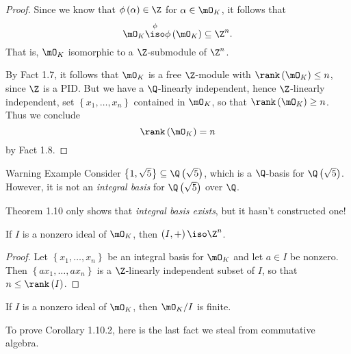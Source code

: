 \documentclass[pmath441]{subfiles}
\begin{document}
\begin{proof}
        Since we know that $\phi\left( \alpha \right)\in\Z$ for $\alpha\in\mO_K$, it follows that
        \begin{equation*}
            \mO_K \overset{\phi}{\iso} \phi\left( \mO_K \right)\subseteq\Z^n.
        \end{equation*}
        That is, $\mO_K$ isomorphic to a $\Z$-submodule of $\Z^n$.

        By Fact 1.7, it follows that $\mO_K$ is a free $\Z$-module with $\rank\left( \mO_K \right) \leq n$, since $\Z$ is a PID. But we have a $\Q$-linearly independent, hence $\Z$-linearly independent, set $\left\lbrace x_1,\ldots,x_n \right\rbrace$ contained in $\mO_K$, so that $\rank\left( \mO_K \right)\geq n$. Thus we conclude
        \begin{equation*}
            \rank\left( \mO_K \right) = n
        \end{equation*}
        by Fact 1.8.
    \end{proof}

    \begin{example}{Warning Example}
        Consider $\left\lbrace 1,\sqrt{5} \right\rbrace\subseteq\Q\left( \sqrt{5} \right)$, which is a $\Q$-basis for $\Q\left( \sqrt{5} \right)$. However, it is not an \textit{integral basis} for $\Q\left( \sqrt{5} \right)$ over $\Q$.

        Theorem 1.10 only shows that \textit{integral basis exists}, but it hasn't constructed one!
    \end{example}

    \rruleline

    \begin{cor}{}
        If $I$ is a nonzero ideal of $\mO_K$, then $\left( I,+ \right)\iso\Z^n$.
    \end{cor}	

    \begin{proof}
        Let $\left\lbrace x_1,\ldots,x_n \right\rbrace$ be an integral basis for $\mO_K$ and let $a\in I$ be nonzero. Then $\left\lbrace ax_1,\ldots,ax_n \right\rbrace$ is a $\Z$-linearly independent subset of $I$, so that $n\leq\rank\left( I \right)$.
    \end{proof}

    \begin{cor}{}
        If $I$ is a nonzero ideal of $\mO_K$, then $\mO_K /I$ is finite.
    \end{cor}	

    \rruleline

    \np To prove Corollary 1.10.2, here is the last fact we steal from commutative algebra.
\end{document}
